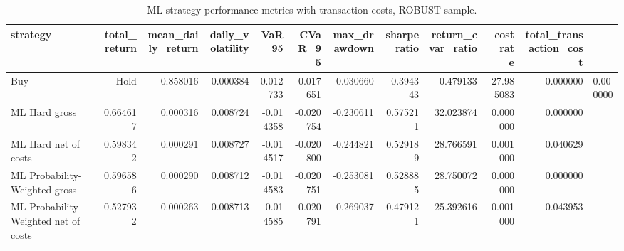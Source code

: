 \begin{table}
\caption{ML strategy performance metrics with transaction costs, ROBUST sample.}
\label{tab:ml_performance_metrics_with_costs_robust}
\begin{tabular}{lrrrrrrrrrr}
\toprule
strategy & total_return & mean_daily_return & daily_volatility & VaR_95 & CVaR_95 & max_drawdown & sharpe_ratio & return_cvar_ratio & cost_rate & total_transaction_cost \\
\midrule
Buy & Hold & 0.858016 & 0.000384 & 0.012733 & -0.017651 & -0.030660 & -0.394343 & 0.479133 & 27.985083 & 0.000000 & 0.000000 \\
ML Hard gross & 0.664617 & 0.000316 & 0.008724 & -0.014358 & -0.020754 & -0.230611 & 0.575211 & 32.023874 & 0.000000 & 0.000000 \\
ML Hard net of costs & 0.598342 & 0.000291 & 0.008727 & -0.014517 & -0.020800 & -0.244821 & 0.529189 & 28.766591 & 0.001000 & 0.040629 \\
ML Probability-Weighted gross & 0.596586 & 0.000290 & 0.008712 & -0.014583 & -0.020751 & -0.253081 & 0.528885 & 28.750072 & 0.000000 & 0.000000 \\
ML Probability-Weighted net of costs & 0.527932 & 0.000263 & 0.008713 & -0.014585 & -0.020791 & -0.269037 & 0.479121 & 25.392616 & 0.001000 & 0.043953 \\
\bottomrule
\end{tabular}
\end{table}
